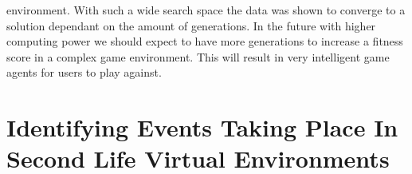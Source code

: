 \documentclass[12pt]{article} %
\begin{document}
environment. With such a wide search space the data was shown to converge to a solution dependant on the amount of generations. In the future with higher computing power we should expect  to have more generations to increase a fitness score in a complex game environment. This will result in very intelligent game agents for users to play against. 

\newpage

\section{Identifying Events Taking Place In Second Life Virtual Environments} %
\end{document}
